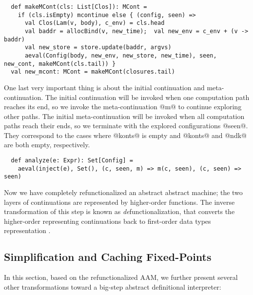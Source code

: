 \documentclass[acmsmall, review]{acmart}\settopmatter{}
\begin{document}
\begin{lstlisting}
  def makeMCont(cls: List[Clos]): MCont =
    if (cls.isEmpty) mcontinue else { (config, seen) =>
      val Clos(Lam(v, body), c_env) = cls.head
      val baddr = allocBind(v, new_time);  val new_env = c_env + (v -> baddr)
      val new_store = store.update(baddr, argvs)
      aeval(Config(body, new_env, new_store, new_time), seen, new_cont, makeMCont(cls.tail)) }
  val new_mcont: MCont = makeMCont(closures.tail)
\end{lstlisting}

One last very important thing is about the initial continuation and meta-continuation.
The initial continuation will be invoked when one computation path reaches its end,
so we invoke the meta-continuation @m@ to continue exploring other paths.
The initial meta-continuation will be invoked when all computation paths reach their ends,
so we terminate with the explored configurations @seen@. They correspond to the 
cases where @konts@ is empty and @konts@ and @ndk@ are both empty, respectively.

\begin{lstlisting}
  def analyze(e: Expr): Set[Config] =
    aeval(inject(e), Set(), (c, seen, m) => m(c, seen), (c, seen) => seen)
\end{lstlisting}

Now we have completely refunctionalized an abstract abstract machine; the two layers
of continuations are represented by higher-order functions. The inverse transformation 
of this step is known as \textit{de}functionalization, that converts the higher-order
representing continuations back to first-order data types representation 
\cite{Danvy:2001:DW:773184.773202, Danvy:2008:DIP:1411204.1411206}.

\subsection{Simplification and Caching Fixed-Points}

In this section, based on the refunctionalized AAM, we further present several other 
transformations toward a big-step abstract definitional interpreter:
\end{document}
